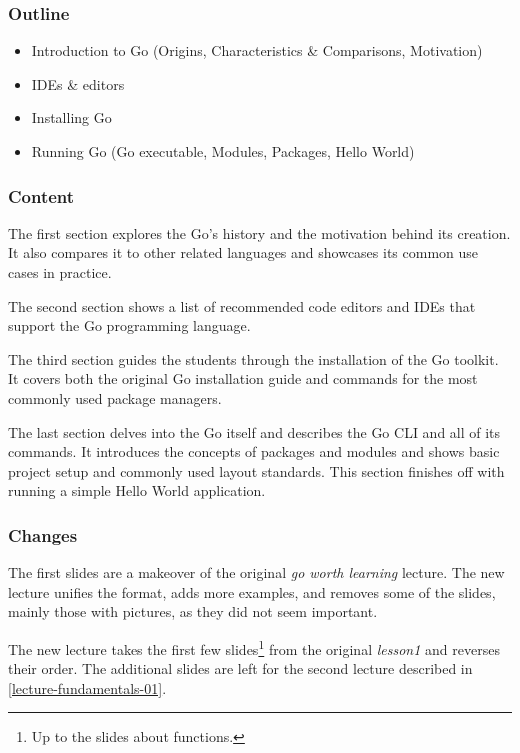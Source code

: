 \documentclass[
  digital,
  color,
  oneside,
  nosansbold,
  nocolorbold,
  nolof,
  nolot,
]{fithesis4}
\begin{document}
\subsubsection{Outline}

\begin{itemize}
    \item Introduction to Go (Origins, Characteristics \& Comparisons, Motivation)
    \item IDEs \& editors
    \item Installing Go
    \item Running Go (Go executable, Modules, Packages, Hello World)
\end{itemize}

\subsubsection{Content}

The first section explores the Go's history and the motivation behind its creation. It also compares it to other related languages and showcases its common use cases in practice.

The second section shows a list of recommended code editors and IDEs that support the Go programming language.

The third section guides the students through the installation of the Go toolkit. It covers both the original Go installation guide and commands for the most commonly used package managers.

The last section delves into the Go itself and describes the Go CLI and all of its commands. It introduces the concepts of packages and modules and shows basic project setup and commonly used layout standards. This section finishes off with running a simple Hello World application.

\subsubsection{Changes}

The first slides are a makeover of the original \textit{go worth learning} lecture. The new lecture unifies the format, adds more examples, and removes some of the slides, mainly those with pictures, as they did not seem important.

The new lecture takes the first few slides\footnote{Up to the slides about functions.} from the original \textit{lesson1} and reverses their order. The additional slides are left for the second lecture described in \cref{lecture-fundamentals-01}.
\end{document}
